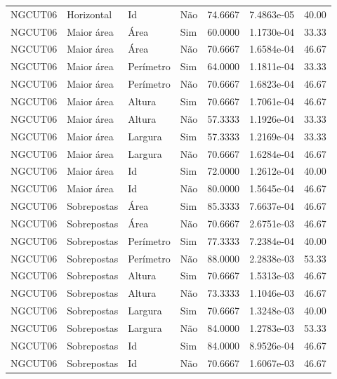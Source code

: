 \begin{tabular}{llllrrr}
NGCUT06   & Horizontal  & Id        & Não         & 74.6667      & 7.4863e-05 & 40.00    \\
NGCUT06   & Maior área  & Área      & Sim         & 60.0000      & 1.1730e-04 & 33.33    \\
NGCUT06   & Maior área  & Área      & Não         & 70.6667      & 1.6584e-04 & 46.67    \\
NGCUT06   & Maior área  & Perímetro & Sim         & 64.0000      & 1.1811e-04 & 33.33    \\
NGCUT06   & Maior área  & Perímetro & Não         & 70.6667      & 1.6823e-04 & 46.67    \\
NGCUT06   & Maior área  & Altura    & Sim         & 70.6667      & 1.7061e-04 & 46.67    \\
NGCUT06   & Maior área  & Altura    & Não         & 57.3333      & 1.1926e-04 & 33.33    \\
NGCUT06   & Maior área  & Largura   & Sim         & 57.3333      & 1.2169e-04 & 33.33    \\
NGCUT06   & Maior área  & Largura   & Não         & 70.6667      & 1.6284e-04 & 46.67    \\
NGCUT06   & Maior área  & Id        & Sim         & 72.0000      & 1.2612e-04 & 40.00    \\
NGCUT06   & Maior área  & Id        & Não         & 80.0000      & 1.5645e-04 & 46.67    \\
NGCUT06   & Sobrepostas & Área      & Sim         & 85.3333      & 7.6637e-04 & 46.67    \\
NGCUT06   & Sobrepostas & Área      & Não         & 70.6667      & 2.6751e-03 & 46.67    \\
NGCUT06   & Sobrepostas & Perímetro & Sim         & 77.3333      & 7.2384e-04 & 40.00    \\
NGCUT06   & Sobrepostas & Perímetro & Não         & 88.0000      & 2.2838e-03 & 53.33    \\
NGCUT06   & Sobrepostas & Altura    & Sim         & 70.6667      & 1.5313e-03 & 46.67    \\
NGCUT06   & Sobrepostas & Altura    & Não         & 73.3333      & 1.1046e-03 & 46.67    \\
NGCUT06   & Sobrepostas & Largura   & Sim         & 70.6667      & 1.3248e-03 & 40.00    \\
NGCUT06   & Sobrepostas & Largura   & Não         & 84.0000      & 1.2783e-03 & 53.33    \\
NGCUT06   & Sobrepostas & Id        & Sim         & 84.0000      & 8.9526e-04 & 46.67    \\
NGCUT06   & Sobrepostas & Id        & Não         & 70.6667      & 1.6067e-03 & 46.67    \\
\hline
\end{tabular}
